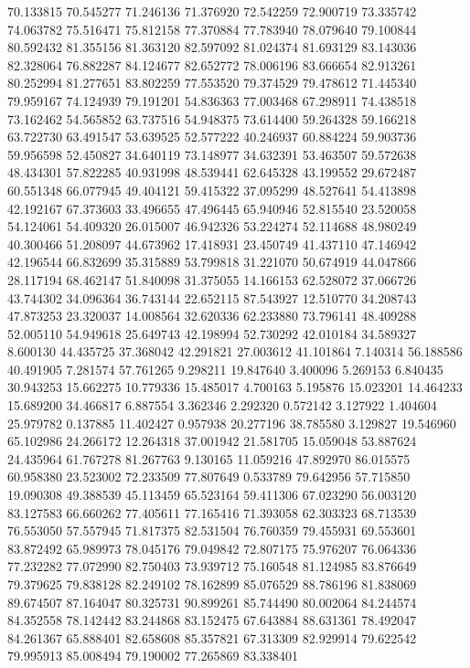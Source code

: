 70.133815
70.545277
71.246136
71.376920
72.542259
72.900719
73.335742
74.063782
75.516471
75.812158
77.370884
77.783940
78.079640
79.100844
80.592432
81.355156
81.363120
82.597092
81.024374
81.693129
83.143036
82.328064
76.882287
84.124677
82.652772
78.006196
83.666654
82.913261
80.252994
81.277651
83.802259
77.553520
79.374529
79.478612
71.445340
79.959167
74.124939
79.191201
54.836363
77.003468
67.298911
74.438518
73.162462
54.565852
63.737516
54.948375
73.614400
59.264328
59.166218
63.722730
63.491547
53.639525
52.577222
40.246937
60.884224
59.903736
59.956598
52.450827
34.640119
73.148977
34.632391
53.463507
59.572638
48.434301
57.822285
40.931998
48.539441
62.645328
43.199552
29.672487
60.551348
66.077945
49.404121
59.415322
37.095299
48.527641
54.413898
42.192167
67.373603
33.496655
47.496445
65.940946
52.815540
23.520058
54.124061
54.409320
26.015007
46.942326
53.224274
52.114688
48.980249
40.300466
51.208097
44.673962
17.418931
23.450749
41.437110
47.146942
42.196544
66.832699
35.315889
53.799818
31.221070
50.674919
44.047866
28.117194
68.462147
51.840098
31.375055
14.166153
62.528072
37.066726
43.744302
34.096364
36.743144
22.652115
87.543927
12.510770
34.208743
47.873253
23.320037
14.008564
32.620336
62.233880
73.796141
48.409288
52.005110
54.949618
25.649743
42.198994
52.730292
42.010184
34.589327
8.600130
44.435725
37.368042
42.291821
27.003612
41.101864
7.140314
56.188586
40.491905
7.281574
57.761265
9.298211
19.847640
3.400096
5.269153
6.840435
30.943253
15.662275
10.779336
15.485017
4.700163
5.195876
15.023201
14.464233
15.689200
34.466817
6.887554
3.362346
2.292320
0.572142
3.127922
1.404604
25.979782
0.137885
11.402427
0.957938
20.277196
38.785580
3.129827
19.546960
65.102986
24.266172
12.264318
37.001942
21.581705
15.059048
53.887624
24.435964
61.767278
81.267763
9.130165
11.059216
47.892970
86.015575
60.958380
23.523002
72.233509
77.807649
0.533789
79.642956
57.715850
19.090308
49.388539
45.113459
65.523164
59.411306
67.023290
56.003120
83.127583
66.660262
77.405611
77.165416
71.393058
62.303323
68.713539
76.553050
57.557945
71.817375
82.531504
76.760359
79.455931
69.553601
83.872492
65.989973
78.045176
79.049842
72.807175
75.976207
76.064336
77.232282
77.072990
82.750403
73.939712
75.160548
81.124985
83.876649
79.379625
79.838128
82.249102
78.162899
85.076529
88.786196
81.838069
89.674507
87.164047
80.325731
90.899261
85.744490
80.002064
84.244574
84.352558
78.142442
83.244868
83.152475
67.643884
88.631361
78.492047
84.261367
65.888401
82.658608
85.357821
67.313309
82.929914
79.622542
79.995913
85.008494
79.190002
77.265869
83.338401
